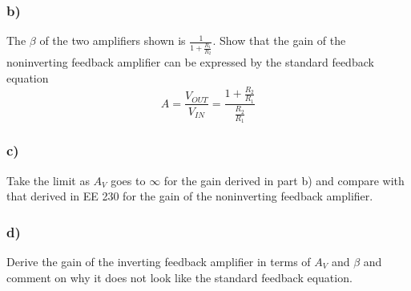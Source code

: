 \documentclass[10pt,a4paper]{article}
\begin{document}
\subsubsection*{b)}
The \(\beta\) of the two amplifiers shown is \(\frac{1}{1 + \frac{R_1}{R_2}}\). Show that the gain of the
noninverting feedback amplifier can be expressed by the standard feedback
equation
\[
A = \frac{V_{OUT}}{V_{IN}} = \frac{1 + \frac{R_2}{R_1}}{\frac{R_2}{R_1}}
\]

\subsubsection*{c)}
Take the limit as \(A_V\) goes to $\infty$ for the gain derived in part b) and compare with
that derived in EE 230 for the gain of the noninverting feedback amplifier.

\subsubsection*{d)}
Derive the gain of the inverting feedback amplifier in terms of \(A_V\) and \(\beta\) and
comment on why it does not look like the standard feedback equation.
\end{document}
